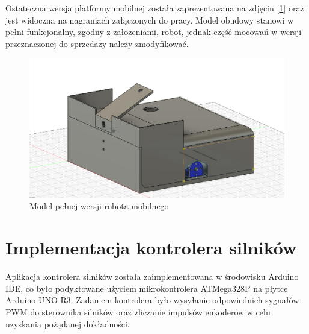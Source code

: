 Ostateczna wersja platformy mobilnej została zaprezentowana na zdjęciu [\ref{fig:full}] oraz jest widoczna na nagraniach załączonych do pracy. Model obudowy stanowi w pełni funkcjonalny, zgodny z założeniami, robot, jednak część mocowań w wersji przeznaczonej do sprzedaży należy zmodyfikować. 

\begin{figure}[H]
  \centering
  \includegraphics[width=1.0\textwidth]{./graf/official-full.png}
  \caption{Model pełnej wersji robota mobilnego}
  \label{fig:full}
\end{figure}




 
\clearpage

\section{Implementacja kontrolera silników}

Aplikacja kontrolera silników została zaimplementowana w środowisku Arduino IDE, co było podyktowane użyciem mikrokontrolera ATMega328P na płytce Arduino UNO R3. Zadaniem kontrolera było wysyłanie odpowiednich sygnałów PWM do sterownika silników oraz zliczanie impulsów enkoderów w celu uzyskania pożądanej dokładności. 


